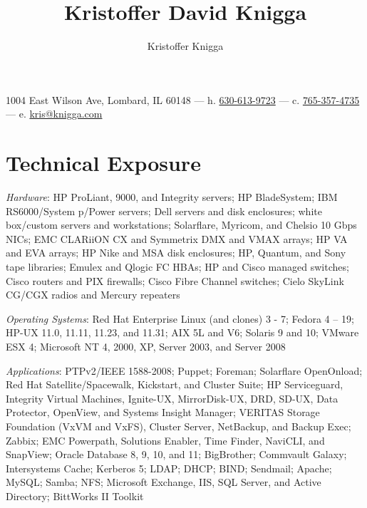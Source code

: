 \documentclass[9pt]{extarticle} %
\title{Kristoffer David Knigga}
\author{Kristoffer Knigga}
\begin{document}



1004 East Wilson Ave, Lombard, IL 60148 \hfill --- \hfill h. \href{tel:630-613-9723}{630-613-9723} \hfill --- \hfill c. \href{tel:765-357-4735}{765-357-4735} \hfill --- \hfill e. \href{mailto:kris@knigga.com}{kris@knigga.com}


\section{Technical Exposure}

\textit{Hardware}: HP ProLiant, 9000, and Integrity servers; HP BladeSystem; IBM RS6000/System p/Power servers; Dell servers and disk enclosures; white box/custom servers and workstations; Solarflare, Myricom, and Chelsio 10 Gbps NICs; EMC CLARiiON CX and Symmetrix DMX and VMAX arrays; HP VA and EVA arrays; HP Nike and MSA disk enclosures; HP, Quantum, and Sony tape libraries; Emulex and Qlogic FC HBAs; HP and Cisco managed switches; Cisco routers and PIX firewalls; Cisco Fibre Channel switches; Cielo SkyLink CG/CGX radios and Mercury repeaters

\bigskip

\textit{Operating Systems}: Red Hat Enterprise Linux (and clones) 3 - 7; Fedora 4 -- 19; HP-UX 11.0, 11.11, 11.23, and 11.31; AIX 5L and V6; Solaris 9 and 10; VMware ESX 4; Microsoft NT 4, 2000, XP, Server 2003, and Server 2008

\bigskip

\textit{Applications}: PTPv2/IEEE 1588-2008; Puppet; Foreman; Solarflare OpenOnload; Red Hat Satellite/Spacewalk, Kickstart, and Cluster Suite; HP Serviceguard, Integrity Virtual Machines, Ignite-UX, MirrorDisk-UX, DRD, SD-UX, Data Protector, OpenView, and Systems Insight Manager; VERITAS Storage Foundation (VxVM and VxFS), Cluster Server, NetBackup, and Backup Exec; Zabbix; EMC Powerpath, Solutions Enabler, Time Finder, NaviCLI, and SnapView; Oracle Database 8, 9, 10, and 11; BigBrother; Commvault Galaxy; Intersystems Cache; Kerberos 5; LDAP; DHCP; BIND; Sendmail; Apache; MySQL; Samba; NFS; Microsoft Exchange, IIS, SQL Server, and Active Directory; BittWorks II Toolkit
\end{document}
